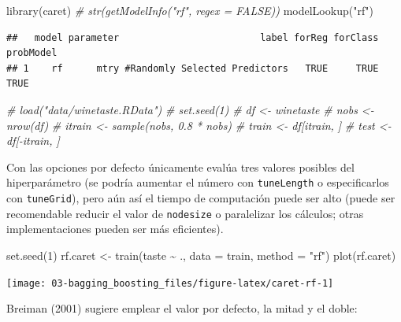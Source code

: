 \documentclass[
]{book}
\newenvironment{Shaded}{\begin{snugshade}}{\end{snugshade}}
\newcommand{\AttributeTok}[1]{\textcolor[rgb]{0.77,0.63,0.00}{#1}}
\newcommand{\CommentTok}[1]{\textcolor[rgb]{0.56,0.35,0.01}{\textit{#1}}}
\newcommand{\DecValTok}[1]{\textcolor[rgb]{0.00,0.00,0.81}{#1}}
\newcommand{\FunctionTok}[1]{\textcolor[rgb]{0.00,0.00,0.00}{#1}}
\newcommand{\NormalTok}[1]{#1}
\newcommand{\OtherTok}[1]{\textcolor[rgb]{0.56,0.35,0.01}{#1}}
\newcommand{\SpecialCharTok}[1]{\textcolor[rgb]{0.00,0.00,0.00}{#1}}
\newcommand{\StringTok}[1]{\textcolor[rgb]{0.31,0.60,0.02}{#1}}
\theoremstyle{break}
\theoremstyle{definition}
\theoremstyle{definition}
\theoremstyle{definition}
\theoremstyle{definition}
\theoremstyle{remark}
\begin{document}
\begin{Shaded}
\begin{Highlighting}[]
\FunctionTok{library}\NormalTok{(caret)}
\CommentTok{\# str(getModelInfo("rf", regex = FALSE))}
\FunctionTok{modelLookup}\NormalTok{(}\StringTok{"rf"}\NormalTok{)}
\end{Highlighting}
\end{Shaded}

\begin{verbatim}
##   model parameter                         label forReg forClass probModel
## 1    rf      mtry #Randomly Selected Predictors   TRUE     TRUE      TRUE
\end{verbatim}

\begin{Shaded}
\begin{Highlighting}[]
\CommentTok{\# load("data/winetaste.RData")}
\CommentTok{\# set.seed(1)}
\CommentTok{\# df \textless{}{-} winetaste}
\CommentTok{\# nobs \textless{}{-} nrow(df)}
\CommentTok{\# itrain \textless{}{-} sample(nobs, 0.8 * nobs)}
\CommentTok{\# train \textless{}{-} df[itrain, ]}
\CommentTok{\# test \textless{}{-} df[{-}itrain, ]}
\end{Highlighting}
\end{Shaded}

Con las opciones por defecto únicamente evalúa tres valores posibles del hiperparámetro (se podría aumentar el número con \texttt{tuneLength} o especificarlos con \texttt{tuneGrid}), pero aún así el tiempo de computación puede ser alto (puede ser recomendable reducir el valor de \texttt{nodesize} o paralelizar los cálculos; otras implementaciones pueden ser más eficientes).

\begin{Shaded}
\begin{Highlighting}[]
\FunctionTok{set.seed}\NormalTok{(}\DecValTok{1}\NormalTok{)}
\NormalTok{rf.caret }\OtherTok{\textless{}{-}} \FunctionTok{train}\NormalTok{(taste }\SpecialCharTok{\textasciitilde{}}\NormalTok{ ., }\AttributeTok{data =}\NormalTok{ train, }\AttributeTok{method =} \StringTok{"rf"}\NormalTok{)}
\FunctionTok{plot}\NormalTok{(rf.caret)}
\end{Highlighting}
\end{Shaded}

\begin{center}\texttt{[image: 03-bagging\_boosting\_files/figure-latex/caret-rf-1]} \end{center}

Breiman (2001) sugiere emplear el valor por defecto, la mitad y el doble:
\end{document}
